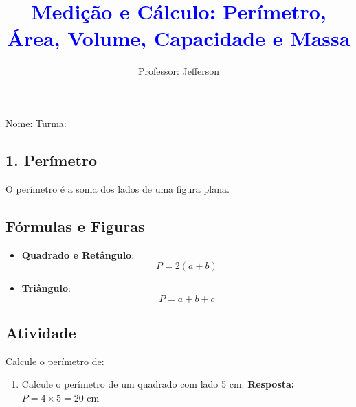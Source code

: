 \documentclass[11pt]{article}
\title{\textcolor{blue}{Medição e Cálculo: Perímetro, Área, Volume, Capacidade e Massa}}
\author{Professor: Jefferson}
\date{}
\begin{document}
\maketitle
\vspace{-1cm}

\begin{center}
\large{Nome: \underline{\hspace{8cm}} \quad Turma: \underline{\hspace{3cm}}}
\end{center}

\begin{multicols}{2}

\section*{1. Perímetro}
O perímetro é a soma dos lados de uma figura plana.

\subsection*{Fórmulas e Figuras}
\begin{itemize}
    \item \textbf{ Quadrado e Retângulo}:
    \[
    P = 2(a + b)
    \]
    \begin{center}
    \end{center}
    
    \item \textbf{Triângulo}:
    \[
    P = a + b + c
    \]
    \begin{center}
    \end{center}

\end{itemize}

\subsection*{Atividade}
Calcule o perímetro de:
\begin{enumerate}[label=\alph*)]
    \item  Calcule o perímetro de um quadrado com lado 5 cm.
    \textbf{Resposta:} $P = 4 \times 5 = 20$ cm
    

\end{enumerate}
\end{multicols}
\end{document}
